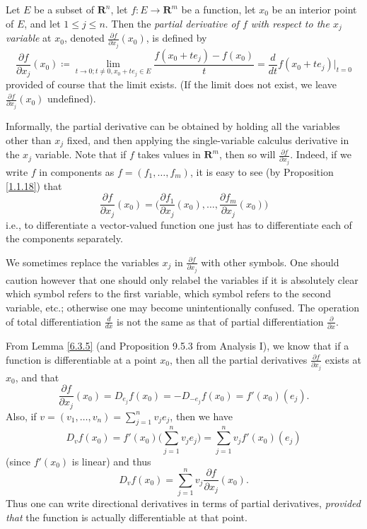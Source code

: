 \begin{definition}\label{6.3.7}
    Let \(E\) be a subset of \(\mathbf{R}^n\), let \(f : E \to \mathbf{R}^m\) be a function, let \(x_0\) be an interior point of \(E\), and let \(1 \leq j \leq n\).
    Then the \emph{partial derivative of \(f\) with respect to the \(x_j\) variable} at \(x_0\), denoted \(\frac{\partial f}{\partial x_j}(x_0)\), is defined by
    \[
        \frac{\partial f}{\partial x_j}(x_0) \coloneqq \lim_{t \to 0 ; t \neq 0, x_0 + t e_j \in E} \frac{f(x_0 + t e_j) - f(x_0)}{t} = \frac{d}{dt} f(x_0 + t e_j)|_{t = 0}
    \]
    provided of course that the limit exists.
    (If the limit does not exist, we leave \(\frac{\partial f}{\partial x_j}(x_0)\) undefined).
\end{definition}

\begin{additional corollary}\label{ac 6.3.1}
Informally, the partial derivative can be obtained by holding all the variables other than \(x_j\) fixed, and then applying the single-variable calculus derivative in the \(x_j\) variable.
Note that if \(f\) takes values in \(\mathbf{R}^m\), then so will \(\frac{\partial f}{\partial x_j}\).
Indeed, if we write \(f\) in components as \(f = (f_1, \dots, f_m)\), it is easy to see (by Proposition \ref{1.1.18}) that
\[
    \frac{\partial f}{\partial x_j}(x_0) = \bigg(\frac{\partial f_1}{\partial x_j}(x_0), \dots, \frac{\partial f_m}{\partial x_j}(x_0)\bigg)
\]
i.e., to differentiate a vector-valued function one just has to differentiate each of the components separately.
\end{additional corollary}

\begin{note}
    We sometimes replace the variables \(x_j\) in \(\frac{\partial f}{\partial x_j}\) with other symbols.
    One should caution however that one should only relabel the variables if it is absolutely clear which symbol refers to the first variable, which symbol refers to the second variable, etc.;
    otherwise one may become unintentionally confused.
    The operation of total differentiation \(\frac{d}{dx}\) is not the same as that of partial differentiation \(\frac{\partial}{\partial x}\).
\end{note}

\begin{additional corollary}\label{ac 6.3.2}
From Lemma \ref{6.3.5} (and Proposition 9.5.3 from Analysis I), we know that if a function is differentiable at a point \(x_0\), then all the partial derivatives \(\frac{\partial f}{\partial x_j}\) exists at \(x_0\), and that
\[
    \frac{\partial f}{\partial x_j}(x_0) = D_{e_j} f(x_0) = - D_{-e_j} f(x_0) = f'(x_0)(e_j).
\]
Also, if \(v = (v_1, \dots, v_n) = \sum_{j = 1}^n v_j e_j\), then we have
\[
    D_v f(x_0) = f'(x_0) \bigg(\sum_{j = 1}^n v_j e_j\bigg) = \sum_{j = 1}^n v_j f'(x_0)(e_j)
\]
(since \(f'(x_0)\) is linear) and thus
\[
    D_v f(x_0) = \sum_{j = 1}^n v_j \frac{\partial f}{\partial x_j}(x_0).
\]
Thus one can write directional derivatives in terms of partial derivatives, \emph{provided that} the function is actually differentiable at that point.
\end{additional corollary}

